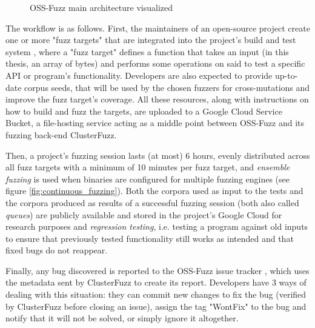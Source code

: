 \begin{figure}[h]
\caption{OSS-Fuzz main architecture visualized \cite{ossfuzz_docs}}
\label{fig:ossfuzz_architecture}
\end{figure}

The workflow is as follows. First, the maintainers of an open-source project create one or more "fuzz targets" that are integrated into the project's build and test system \cite{libfuzzer_docs}, where a "fuzz target" defines a function that takes an input (in this thesis, an array of bytes) and performs some operations on said to test a specific API or program's functionality. Developers are also expected to provide up-to-date corpus seeds, that will be used by the chosen fuzzers for cross-mutations and improve the fuzz target’s coverage. All these resources, along with instructions on how to build and fuzz the targets, are uploaded to a Google Cloud Service Bucket, a file-hosting service acting as a middle point between OSS-Fuzz and its fuzzing back-end ClusterFuzz.

Then, a project's fuzzing session lasts (at most) 6 hours, evenly distributed across all fuzz targets with a minimum of 10 minutes per fuzz target, and \textit{ensemble fuzzing} is used when binaries are configured for multiple fuzzing engines (see figure \ref{fig:continuous_fuzzing}). Both the corpora used as input to the tests and the corpora produced as results of a successful fuzzing session (both also called \textit{queues}) are publicly available and stored in the project's Google Cloud for research purposes and \textit{regression testing}, i.e. testing a program against old inputs to ensure that previously tested functionality still works as intended and that fixed bugs do not reappear.

Finally, any bug discovered is reported to the OSS-Fuzz issue tracker \cite{ossfuzz_bugtracker}, which uses the metadata sent by ClusterFuzz to create its report. Developers have 3 ways of dealing with this situation: they can commit new changes to fix the bug (verified by ClusterFuzz before closing an issue), assign the tag "WontFix" to the bug and notify that it will not be solved, or simply ignore it altogether. 



